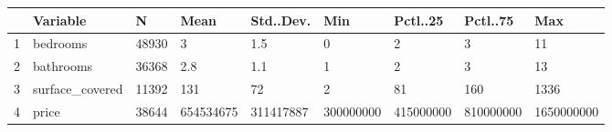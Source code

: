 \begin{tabular}{rllllllll}
  \hline
 & Variable & N & Mean & Std..Dev. & Min & Pctl..25 & Pctl..75 & Max \\ 
  \hline
1 & bedrooms & 48930 & 3 & 1.5 & 0 & 2 & 3 & 11 \\ 
  2 & bathrooms & 36368 & 2.8 & 1.1 & 1 & 2 & 3 & 13 \\ 
  3 & surface\_covered & 11392 & 131 & 72 & 2 & 81 & 160 & 1336 \\ 
  4 & price & 38644 & 654534675 & 311417887 & 300000000 & 415000000 & 810000000 & 1650000000 \\ 
   \hline
\end{tabular}
